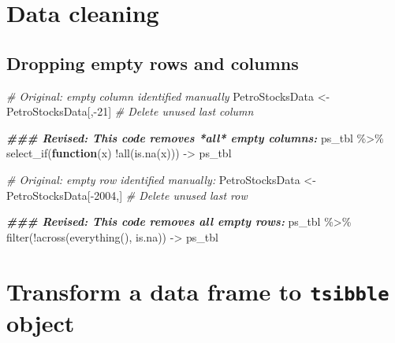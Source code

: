 \documentclass[
]{book}
\newenvironment{Shaded}{\begin{snugshade}}{\end{snugshade}}
\newcommand{\CommentTok}[1]{\textcolor[rgb]{0.56,0.35,0.01}{\textit{#1}}}
\newcommand{\ControlFlowTok}[1]{\textcolor[rgb]{0.13,0.29,0.53}{\textbf{#1}}}
\newcommand{\DecValTok}[1]{\textcolor[rgb]{0.00,0.00,0.81}{#1}}
\newcommand{\DocumentationTok}[1]{\textcolor[rgb]{0.56,0.35,0.01}{\textbf{\textit{#1}}}}
\newcommand{\FunctionTok}[1]{\textcolor[rgb]{0.00,0.00,0.00}{#1}}
\newcommand{\NormalTok}[1]{#1}
\newcommand{\OtherTok}[1]{\textcolor[rgb]{0.56,0.35,0.01}{#1}}
\newcommand{\SpecialCharTok}[1]{\textcolor[rgb]{0.00,0.00,0.00}{#1}}
\begin{document}
\hypertarget{data-cleaning}{%
\chapter{Data cleaning}\label{data-cleaning}}

\hypertarget{dropping-empty-rows-and-columns}{%
\section{Dropping empty rows and columns}\label{dropping-empty-rows-and-columns}}

\begin{Shaded}
\begin{Highlighting}[]
\CommentTok{\# Original: empty column identified manually}
\NormalTok{PetroStocksData }\OtherTok{\textless{}{-}}\NormalTok{ PetroStocksData[,}\SpecialCharTok{{-}}\DecValTok{21}\NormalTok{] }\CommentTok{\# Delete unused last column}

\DocumentationTok{\#\#\# Revised: This code removes *all* empty columns:}
\NormalTok{ps\_tbl }\SpecialCharTok{\%\textgreater{}\%} \FunctionTok{select\_if}\NormalTok{(}\ControlFlowTok{function}\NormalTok{(x) }\SpecialCharTok{!}\FunctionTok{all}\NormalTok{(}\FunctionTok{is.na}\NormalTok{(x))) }\OtherTok{{-}\textgreater{}}\NormalTok{ ps\_tbl}
\end{Highlighting}
\end{Shaded}

\begin{Shaded}
\begin{Highlighting}[]
\CommentTok{\# Original: empty row identified manually:}
\NormalTok{PetroStocksData }\OtherTok{\textless{}{-}}\NormalTok{ PetroStocksData[}\SpecialCharTok{{-}}\DecValTok{2004}\NormalTok{,] }\CommentTok{\# Delete unused last row}

\DocumentationTok{\#\#\# Revised: This code removes all empty rows:}
\NormalTok{ps\_tbl }\SpecialCharTok{\%\textgreater{}\%} \FunctionTok{filter}\NormalTok{(}\SpecialCharTok{!}\FunctionTok{across}\NormalTok{(}\FunctionTok{everything}\NormalTok{(), is.na)) }\OtherTok{{-}\textgreater{}}\NormalTok{ ps\_tbl}
\end{Highlighting}
\end{Shaded}

\hypertarget{transform-a-data-frame-to-tsibble-object}{%
\chapter{\texorpdfstring{Transform a data frame to \texttt{tsibble} object}{Transform a data frame to tsibble object}}\label{transform-a-data-frame-to-tsibble-object}}
\end{document}
